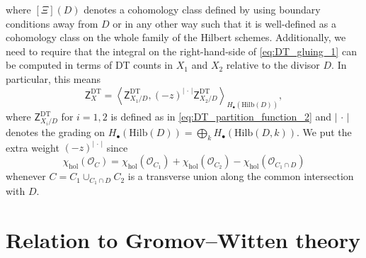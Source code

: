 \documentclass[11pt,colorinlistoftodos]{amsart}
\numberwithin{equation}{subsection}
\theoremstyle{plain}
\theoremstyle{definition}
\theoremstyle{remark}
\begin{document}
where $[\Xi](D)$ denotes a cohomology class defined by using boundary conditions away from $D$ or in any other way such that it is well-defined as a cohomology class on the whole family of the Hilbert schemes. Additionally, we need to require that the integral on the right-hand-side of \eqref{eq:DT_gluing_1} can be computed in terms of DT counts in $X_1$ and $X_2$ relative to the divisor $D$. In particular, this means 
\begin{equation}
    \label{eq:DT_gluing_2}
    \mathsf{Z}^\mathrm{DT}_X=\left\langle\mathsf{Z}^\mathrm{DT}_{X_1/D},(-z)^{\vert\,\cdot\,\vert}\mathsf{Z}^\mathrm{DT}_{X_2/D}\right\rangle_{H_\bullet(\mathrm{Hilb}(D))},
\end{equation}
where $\mathsf{Z}^\mathrm{DT}_{X_i/D}$ for $i=1,2$ is defined as in \eqref{eq:DT_partition_function_2} and $\vert\,\cdot\,\vert$ denotes the grading on $H_\bullet(\mathrm{Hilb}(D))=\bigoplus_kH_\bullet(\mathrm{Hilb}(D,k))$. We put the extra weight $(-z)^{\vert\,\cdot\,\vert}$ since 
\[
\chi_\mathrm{hol}(\mathcal{O}_C)=\chi_\mathrm{hol}(\mathcal{O}_{C_1})+\chi_\mathrm{hol}(\mathcal{O}_{C_2})-\chi_\mathrm{hol}(\mathcal{O}_{C_1\cap D})
\]
whenever $C=C_1\cup_{C_1\cap D}C_2$ is a transverse union along the common intersection with $D$.






\section{Relation to Gromov--Witten theory}
\label{sec:Relation_to_Gromov-Witten_theory}
\end{document}
